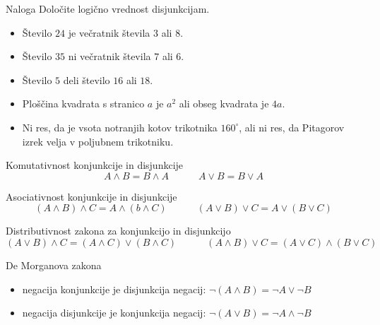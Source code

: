         \begin{frame}
            \begin{exampleblock}{Naloga}
                Določite logično vrednost disjunkcijam.
                \begin{itemize}
                    \item Število $24$ je večratnik števila $3$ ali $8$.
                    \item Število $35$ ni večratnik števila $7$ ali $6$.
                    \item Število $5$ deli število $16$ ali $18$.
                    \item Ploščina kvadrata s stranico $a$ je $a^2$ ali obseg kvadrata je $4a$.
                    \item Ni res, da je vsota notranjih kotov trikotnika $160^\circ$, ali ni res, 
                        da Pitagorov izrek velja v poljubnem trikotniku.
                \end{itemize}
            \end{exampleblock}
        \end{frame}


        \begin{frame}
            \begin{block}{Komutativnost konjunkcije in disjunkcije}
                $$ A\land B = B\land A  \quad \quad \quad
                 A\lor B = B\lor A$$
            \end{block}      
            
            \begin{block}{Asociativnost konjunkcije in disjunkcije}
                $$(A\land B)\land C = A\land(b\land C) \quad \quad \quad
                (A\lor B)\lor C = A\lor (B\lor C) $$
            \end{block}

            \begin{block}{Distributivnost zakona za konjunkcijo in disjunkcijo}
                $$(A\lor B)\land C = (A\land C)\lor(B\land C) \quad \quad \quad
                (A\land B)\lor C = (A\lor C)\land(B\lor C) $$
            \end{block}

            \begin{block}{De Morganova zakona}
                \begin{itemize}
                    \item negacija konjunkcije je disjunkcija negacij: 
                        $\lnot(A\land B)=\lnot A\lor\lnot B$
                    \item negacija disjunkcije je konjunkcija negacij: 
                        $\lnot(A\lor B)=\lnot A\land\lnot B$
                \end{itemize}                
            \end{block}
        
        \end{frame}

